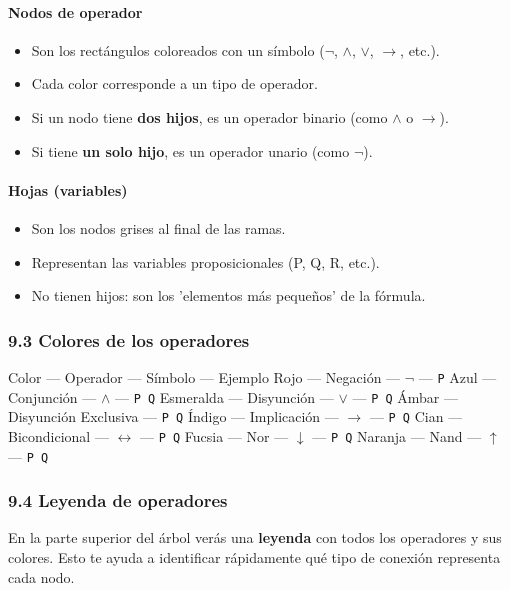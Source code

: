 \documentclass[11pt,a4paper]{article}
\begin{document}
\paragraph{Nodos de operador}
\begin{itemize}[leftmargin=*]
\item Son los rectángulos coloreados con un símbolo ($ \lnot $, $ \land $, $ \lor $, $ \to $, etc.).
\item Cada color corresponde a un tipo de operador.
\item Si un nodo tiene \textbf{dos hijos}, es un operador binario (como $ \land $ o $ \to $).
\item Si tiene \textbf{un solo hijo}, es un operador unario (como $ \lnot $).
\end{itemize}

\paragraph{Hojas (variables)}
\begin{itemize}[leftmargin=*]
\item Son los nodos grises al final de las ramas.
\item Representan las variables proposicionales (P, Q, R, etc.).
\item No tienen hijos: son los 'elementos más pequeños' de la fórmula.
\end{itemize}

\subsubsection{9.3 Colores de los operadores}

Color --- Operador --- Símbolo --- Ejemplo
Rojo --- Negación --- $ \lnot $ --- \texttt{P}
Azul --- Conjunción --- $ \land $ --- \texttt{P  Q}
Esmeralda --- Disyunción --- $ \lor $ --- \texttt{P  Q}
Ámbar --- Disyunción Exclusiva --- \texttt{P  Q}
Índigo --- Implicación --- $ \to $ --- \texttt{P  Q}
Cian --- Bicondicional --- $ \leftrightarrow $ --- \texttt{P  Q}
Fucsia --- Nor --- $ \downarrow $ --- \texttt{P  Q}
Naranja --- Nand --- $ \uparrow $ --- \texttt{P  Q}

\subsubsection{9.4 Leyenda de operadores}

En la parte superior del árbol verás una \textbf{leyenda} con todos los operadores y sus colores. Esto te ayuda a identificar rápidamente qué tipo de conexión representa cada nodo.
\end{document}
